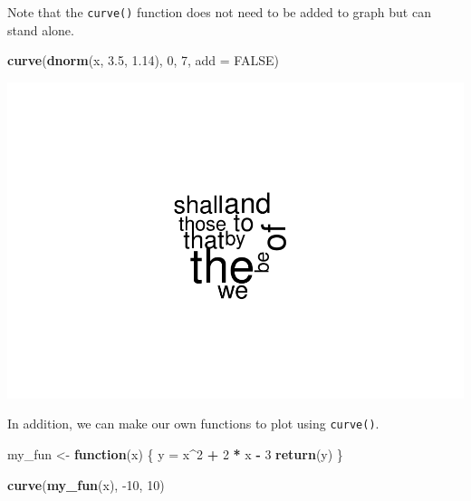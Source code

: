 \documentclass[
]{book}
\newenvironment{Shaded}{\begin{snugshade}}{\end{snugshade}}
\newcommand{\ControlFlowTok}[1]{\textcolor[rgb]{0.13,0.29,0.53}{\textbf{#1}}}
\newcommand{\DataTypeTok}[1]{\textcolor[rgb]{0.13,0.29,0.53}{#1}}
\newcommand{\DecValTok}[1]{\textcolor[rgb]{0.00,0.00,0.81}{#1}}
\newcommand{\FloatTok}[1]{\textcolor[rgb]{0.00,0.00,0.81}{#1}}
\newcommand{\KeywordTok}[1]{\textcolor[rgb]{0.13,0.29,0.53}{\textbf{#1}}}
\newcommand{\NormalTok}[1]{#1}
\newcommand{\OperatorTok}[1]{\textcolor[rgb]{0.81,0.36,0.00}{\textbf{#1}}}
\newcommand{\OtherTok}[1]{\textcolor[rgb]{0.56,0.35,0.01}{#1}}
\newcommand{\StringTok}[1]{\textcolor[rgb]{0.31,0.60,0.02}{#1}}
\begin{document}
Note that the \texttt{curve()} function does not need to be added to graph but can stand alone.

\begin{Shaded}
\begin{Highlighting}[]
\KeywordTok{curve}\NormalTok{(}\KeywordTok{dnorm}\NormalTok{(x, }\FloatTok{3.5}\NormalTok{, }\FloatTok{1.14}\NormalTok{), }\DecValTok{0}\NormalTok{, }\DecValTok{7}\NormalTok{, }\DataTypeTok{add =} \OtherTok{FALSE}\NormalTok{)}
\end{Highlighting}
\end{Shaded}

\includegraphics{_main_files/figure-latex/unnamed-chunk-226-1.pdf}

In addition, we can make our own functions to plot using \texttt{curve()}.

\begin{Shaded}
\begin{Highlighting}[]
\NormalTok{my_fun <-}\StringTok{ }\ControlFlowTok{function}\NormalTok{(x) \{}
\NormalTok{    y =}\StringTok{ }\NormalTok{x}\OperatorTok{^}\DecValTok{2} \OperatorTok{+}\StringTok{ }\DecValTok{2} \OperatorTok{*}\StringTok{ }\NormalTok{x }\OperatorTok{-}\StringTok{ }\DecValTok{3}
    \KeywordTok{return}\NormalTok{(y)}
\NormalTok{\}}

\KeywordTok{curve}\NormalTok{(}\KeywordTok{my_fun}\NormalTok{(x), }\DecValTok{-10}\NormalTok{, }\DecValTok{10}\NormalTok{)}
\end{Highlighting}
\end{Shaded}
\end{document}
